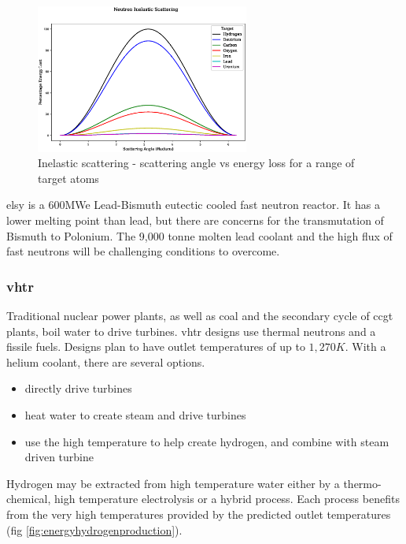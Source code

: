 \begin{figure}[htbp]
  \begin{center}
    \includegraphics[width=7.0cm]{chapters/introduction/plots/neutron_scattering/neutron_scattering.eps}
    \caption{Inelastic scattering - scattering angle vs energy loss for a range of target atoms}
    \label{fig:inelasticscattering}
  \end{center}
\end{figure}

\acrfull{elsy} is a 600MWe Lead-Bismuth \gls{eutectic} cooled fast neutron reactor.  It has a lower melting point than lead, but there are concerns for the transmutation of Bismuth to Polonium.  The 9,000 tonne molten lead coolant and the high flux of fast neutrons\cite{lanltour} will be challenging conditions to overcome.



\FloatBarrier
\subsubsection{\acrshort{vhtr}}

Traditional nuclear power plants, as well as coal and the secondary cycle of \acrshort{ccgt} plants, boil water to drive turbines.  \acrfull{vhtr} designs use thermal neutrons and a fissile fuels.  Designs plan to have outlet temperatures of up to $1,270K$\cite{genivgifvhtr}.  With a helium coolant, there are several options.

\begin{itemize}
\item directly drive turbines
\item heat water to create steam and drive turbines
\item use the high temperature to help create hydrogen, and combine with steam driven turbine
\end{itemize}

Hydrogen may be extracted from high temperature water either by a thermo-chemical, high temperature electrolysis or a hybrid process\cite{hydrogenhtr}.  Each process benefits from the very high temperatures provided by the predicted outlet temperatures (fig \ref{fig:energyhydrogenproduction}).


